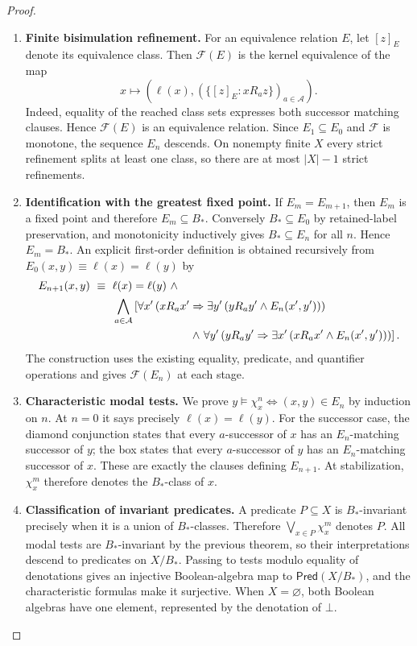 \documentclass[11pt,a4paper]{article}
\numberwithin{equation}{section}
\theoremstyle{definition}
\theoremstyle{remark}
\theoremstyle{plain}
\begin{document}
\begin{proof}
\leavevmode
\begin{enumerate}[label=\textup{(\arabic*)},leftmargin=*,itemsep=4pt,topsep=3pt]
  \item \textbf{Finite bisimulation refinement.} For an equivalence
relation $E$, let $[z]_E$ denote its equivalence class. Then
$\mathcal F(E)$ is the kernel equivalence of the map
\[
  x\longmapsto
  \left(\ell(x),\left(\{[z]_E:xR_az\}\right)_{a\in\mathcal A}\right).
\]
Indeed, equality of the reached class sets expresses both successor
matching clauses. Hence $\mathcal F(E)$ is an equivalence relation.
Since $E_1\subseteq E_0$ and $\mathcal F$ is monotone, the sequence
$E_n$ descends. On nonempty finite $X$ every strict refinement splits
at least one class, so there are at most $|X|-1$ strict refinements.
  \item \textbf{Identification with the greatest fixed point.} If
$E_m=E_{m+1}$, then $E_m$ is a fixed point and therefore
$E_m\subseteq B_*$. Conversely $B_*\subseteq E_0$ by retained-label
preservation, and monotonicity inductively gives $B_*\subseteq E_n$
for all $n$. Hence $E_m=B_*$. An explicit first-order definition is
obtained recursively from $E_0(x,y)\equiv\ell(x)=\ell(y)$ by
\[
\begin{aligned}
 E_{n+1}(x,y)\ \equiv\ {}&\ell(x)=\ell(y)\ \wedge\\
 &\bigwedge_{a\in\mathcal A}\left[
   \forall x'\,(xR_ax'\Rightarrow
      \exists y'\,(yR_ay'\wedge E_n(x',y')))\right.\\
 &\hspace{24mm}\left.\wedge\
   \forall y'\,(yR_ay'\Rightarrow
      \exists x'\,(xR_ax'\wedge E_n(x',y')))
 \right].
\end{aligned}
\]
The construction uses the existing equality, predicate, and quantifier
operations and gives $\mathcal F(E_n)$ at each stage.
  \item \textbf{Characteristic modal tests.} We prove
$y\models\chi_x^n\iff(x,y)\in E_n$ by induction on $n$. At $n=0$
it says precisely $\ell(x)=\ell(y)$. For the successor case, the
diamond conjunction states that every $a$-successor of $x$ has an
$E_n$-matching successor of $y$; the box states that every
$a$-successor of $y$ has an $E_n$-matching successor of $x$.
These are exactly the clauses defining $E_{n+1}$. At stabilization,
$\chi_x^m$ therefore denotes the $B_*$-class of $x$.
  \item \textbf{Classification of invariant predicates.} A predicate
$P\subseteq X$ is $B_*$-invariant precisely when it is a union of
$B_*$-classes. Therefore $\bigvee_{x\in P}\chi_x^m$ denotes $P$.
All modal tests are $B_*$-invariant by the previous theorem, so their
interpretations descend to predicates on $X/B_*$. Passing to tests
modulo equality of denotations gives an injective Boolean-algebra map
to $\mathsf{Pred}(X/B_*)$, and the characteristic formulas make it
surjective. When $X=\varnothing$, both Boolean algebras have one
element, represented by the denotation of $\bot$.
\end{enumerate}
\end{proof}
\end{document}
